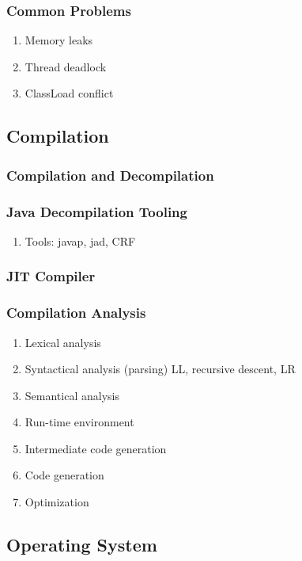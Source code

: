 \documentclass[11pt, twocolumn]{article}
\begin{document}
\subsubsection{Common Problems}
\begin{enumerate}
	\item Memory leaks
	\item Thread deadlock
	\item ClassLoad conflict
\end{enumerate}

\subsection{Compilation}

\subsubsection{Compilation and Decompilation}

\subsubsection{Java Decompilation Tooling}
\begin{enumerate}
	\item Tools:
	\subitem javap, jad, CRF
\end{enumerate}

\subsubsection{JIT Compiler}

\subsubsection{Compilation Analysis}
\begin{enumerate}
	\item Lexical analysis
	\item Syntactical analysis (parsing)
	\subitem LL, recursive descent, LR
	\item Semantical analysis
	\item Run-time environment
	\item Intermediate code generation
	\item Code generation
	\item Optimization
\end{enumerate}

\subsection{Operating System}
\end{document}
